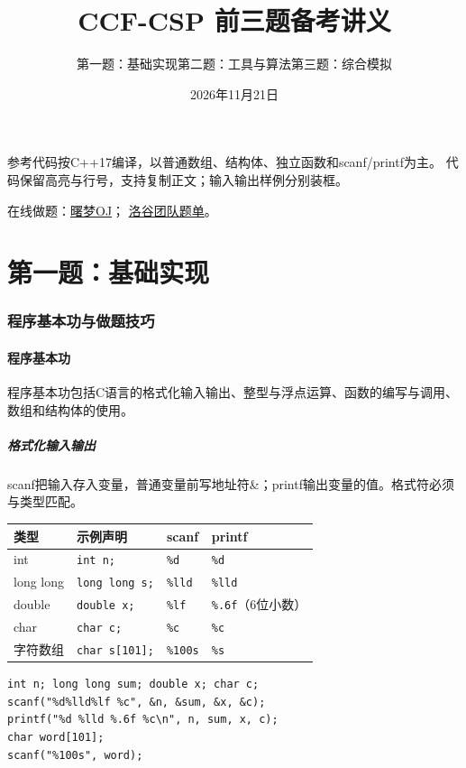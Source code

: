 \documentclass[UTF8,11pt,a4paper,fontset=none]{ctexart}
\title{\textbf{CCF-CSP 前三题备考讲义}}
\author{第一题：基础实现\quad 第二题：工具与算法\quad 第三题：综合模拟}
\date{2026年11月21日}
\begin{document}
\maketitle
\noindent 参考代码按C++17编译，以普通数组、结构体、独立函数和scanf/printf为主。
代码保留高亮与行号，支持复制正文；输入输出样例分别装框。

\noindent 在线做题：\href{https://oj.shumeng.tech/p}{曙梦OJ}；
\href{https://www.luogu.com.cn/team/113242/training}{洛谷团队题单}。
\tableofcontents
\newpage

\clearpage
\part{第一题：基础实现}
\section{程序基本功与做题技巧}
\subsection{程序基本功}
程序基本功包括C语言的格式化输入输出、整型与浮点运算、函数的编写与调用、数组和结构体的使用。
\subsubsection{格式化输入输出}
scanf把输入存入变量，普通变量前写地址符\&；printf输出变量的值。格式符必须与类型匹配。
\begin{center}
\begin{tabular}{llll}
\toprule 类型 & 示例声明 & scanf & printf\\\midrule
int & \texttt{int n;} & \texttt{\%d} & \texttt{\%d}\\
long long & \texttt{long long s;} & \texttt{\%lld} & \texttt{\%lld}\\
double & \texttt{double x;} & \texttt{\%lf} & \texttt{\%.6f}（6位小数）\\
char & \texttt{char c;} & \texttt{\%c} & \texttt{\%c}\\
字符数组 & \texttt{char s[101];} & \texttt{\%100s} & \texttt{\%s}\\
\bottomrule
\end{tabular}
\end{center}
\par\noindent\begin{minipage}{\linewidth}
\begin{lstlisting}
int n; long long sum; double x; char c;
scanf("%d%lld%lf %c", &n, &sum, &x, &c);
printf("%d %lld %.6f %c\n", n, sum, x, c);
char word[101];
scanf("%100s", word);
\end{lstlisting}
\end{minipage}\par
\end{document}
